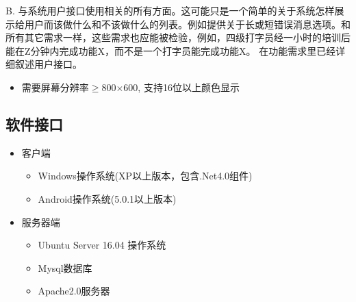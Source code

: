 B. 与系统用户接口使用相关的所有方面。这可能只是一个简单的关于系统怎样展示给用户而该做什么和不该做什么的列表。例如提供关于长或短错误消息选项。和所有其它需求一样，这些需求也应能被检验，例如，四级打字员经一小时的培训后能在Z分钟内完成功能X，而不是一个打字员能完成功能X。
\fi
在功能需求里已经详细叙述用户接口。
\begin{itemize}
	\item 需要屏幕分辨率$\ge$800$\times$600, 支持16位以上颜色显示
\end{itemize}
\subsection{软件接口}
\iffalse
<The interface with other system/modules/projects should be explained in detail. >

详细描述与其他系统 /模块 /项目之间的接口

Describes how to use the other (required) software products. (such as data management system, operation system, or algorithm tools package), and the interfaces to other application systems (such as interfaces between the protocol process system and the database management system )
For each required software product, following information should be provided:
A. Name
B. Mnemonic symbol
C. Version number
D. Source
For each interface, this section should:
A. Discuss the objective of the required software.
B. Define the interfaces by content and format of message/function. If the interfaces have been clearly described in other documents, it is not necessary to describe in detail here. But the reference of those documents should be given.

在此应描述如何使用其它（必需的）软件产品（例如，数据管理系统，操作系统，或算法工具包），以及与其它应用系统的接口（例如，协议处理系统和数据库管理系统之间的接口）。

对每个必需的软件产品，应提供下列信息：
A.	名字
B.	助记符
C.	版本号
D.	来源

对每个接口，本部分应：

A .	讨论与本软件产品相关的接口软件的目的。

B.	按消息/函数内容和格式定义接口。如果接口已在其它文档中很清楚地描述，就没有必要在这儿进行详细描述，但需说明应参考的文档。
\fi
\begin{itemize}
\item 客户端
	\begin{itemize}
	\item Windows操作系统(XP以上版本，包含.Net4.0组件)
	\item Android操作系统(5.0.1以上版本)
	\end{itemize}
\item 服务器端
	\begin{itemize}
	\item Ubuntu Server 16.04 操作系统
	\item Mysql数据库
	\item Apache2.0服务器
	\end{itemize}
\end{itemize}




